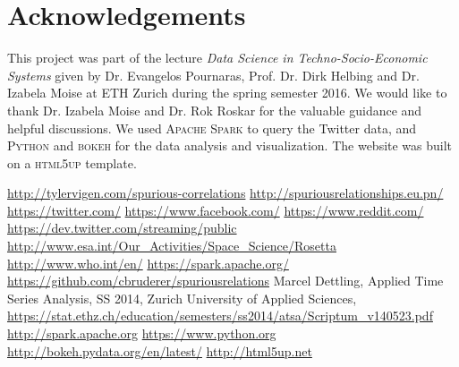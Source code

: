 \documentclass[12pt, a4paper]{article}
\begin{document}
\section{Acknowledgements}
This project was part of the lecture \textit{Data Science in Techno-Socio-Economic Systems} given by Dr. Evangelos Pournaras, Prof. Dr. Dirk Helbing and Dr. Izabela Moise at ETH Zurich during the spring semester 2016. We would like to thank Dr. Izabela Moise and Dr. Rok Roskar for the valuable guidance and helpful discussions. We used \textsc{Apache Spark} \cite{spark}  to query the Twitter data, and \textsc{Python} \cite{python} and \textsc{bokeh} \cite{bokeh} for the data analysis and visualization. The website was built on a \textsc{html5up} \cite{html5up} template.

\begin{thebibliography}{9}

\url{http://tylervigen.com/spurious-correlations}
\url{http://spuriousrelationships.eu.pn/}
\url{https://twitter.com/}
\url{https://www.facebook.com/}
\url{https://www.reddit.com/}
\url{https://dev.twitter.com/streaming/public}
\url{http://www.esa.int/Our_Activities/Space_Science/Rosetta}
\url{http://www.who.int/en/}
\url{https://spark.apache.org/}
\url{https://github.com/cbruderer/spuriousrelations}
 Marcel Dettling, Applied Time Series Analysis, SS 2014, Zurich University of Applied Sciences, \url{https://stat.ethz.ch/education/semesters/ss2014/atsa/Scriptum_v140523.pdf}
\url{http://spark.apache.org}
\url{https://www.python.org}
\url{http://bokeh.pydata.org/en/latest/}
\url{http://html5up.net}

\end{thebibliography}
\end{document}
